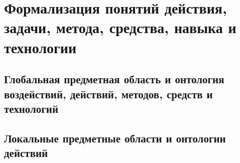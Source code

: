 \chapter{Формализация понятий действия, задачи, метода, средства, навыка и технологии}
\label{chapter_actions}


\section{Глобальная предметная область и онтология воздействий, действий, методов, средств и технологий}
\section{Локальные предметные области и онтологии действий}

%